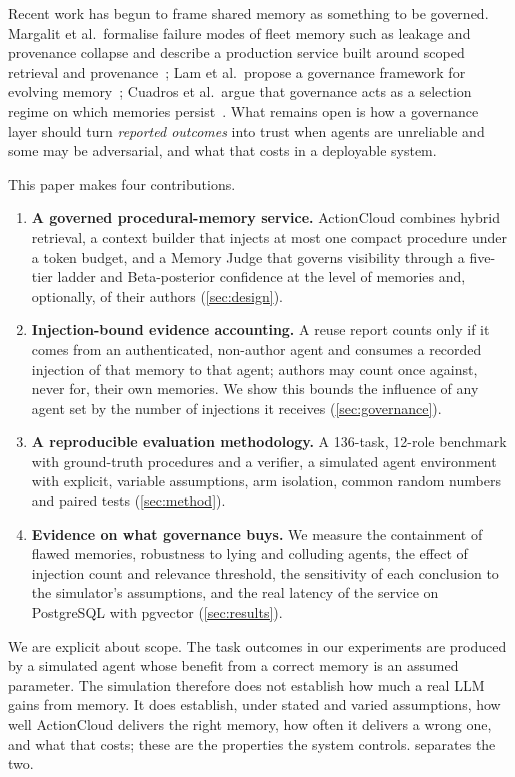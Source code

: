 \documentclass[5p,times,twocolumn]{elsarticle}
\newcommand{\sysname}{ActionCloud}
\begin{document}
Recent work has begun to frame shared memory as something to be governed. Margalit et al.\ formalise failure modes of fleet memory such as leakage and provenance collapse and describe a production service built around scoped retrieval and provenance~\cite{margalit2026governed}; Lam et al.\ propose a governance framework for evolving memory~\cite{lam2026ssgm}; Cuadros et al.\ argue that governance acts as a selection regime on which memories persist~\cite{cuadros2026selection}. What remains open is how a governance layer should turn \emph{reported outcomes} into trust when agents are unreliable and some may be adversarial, and what that costs in a deployable system.

This paper makes four contributions.
\begin{enumerate}
\item \textbf{A governed procedural-memory service.} \sysname{} combines hybrid retrieval, a context builder that injects at most one compact procedure under a token budget, and a Memory Judge that governs visibility through a five-tier ladder and Beta-posterior confidence at the level of memories and, optionally, of their authors (\cref{sec:design}).
\item \textbf{Injection-bound evidence accounting.} A reuse report counts only if it comes from an authenticated, non-author agent and consumes a recorded injection of that memory to that agent; authors may count once against, never for, their own memories. We show this bounds the influence of any agent set by the number of injections it receives (\cref{sec:governance}).
\item \textbf{A reproducible evaluation methodology.} A 136-task, 12-role benchmark with ground-truth procedures and a verifier, a simulated agent environment with explicit, variable assumptions, arm isolation, common random numbers and paired tests (\cref{sec:method}).
\item \textbf{Evidence on what governance buys.} We measure the containment of flawed memories, robustness to lying and colluding agents, the effect of injection count and relevance threshold, the sensitivity of each conclusion to the simulator's assumptions, and the real latency of the service on PostgreSQL with pgvector (\cref{sec:results}).
\end{enumerate}

We are explicit about scope. The task outcomes in our experiments are produced by a simulated agent whose benefit from a correct memory is an assumed parameter. The simulation therefore does not establish how much a real LLM gains from memory. It does establish, under stated and varied assumptions, how well \sysname{} delivers the right memory, how often it delivers a wrong one, and what that costs; these are the properties the system controls.  separates the two.
\end{document}
